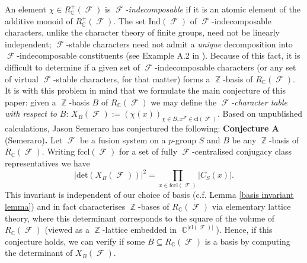 \documentclass[12pt]{article}
\DeclareMathOperator{\C}{\mathbb{C}}
\DeclareMathOperator{\Z}{\mathbb{Z}}
\DeclareMathOperator{\sF}{\mathcal{F}}
\theoremstyle{plain}
\theoremstyle{definition}
\begin{document}
An element $\chi \in R_{\C}^+(\sF)$ is \emph{$\sF$-indecomposable} if it is an atomic element of the additive monoid of $R_{\C}^+(\sF)$. The set $\text{Ind}(\sF)$ of $\sF$-indecomposable characters, unlike the character theory of finite groups, need not be linearly independent; $\sF$-stable characters need not admit a \emph{unique} decomposition into $\sF$-indecomposable constituents (see Example A.2 in  \cite{unique factorisation}). Because of this fact, it is difficult to determine if a given set of $\sF$-indecomposable characters (or any set of virtual $\sF$-stable characters, for that matter) forms a $\Z$-basis of $R_{\C}(\sF)$. It is with this problem in mind that we formulate the main conjecture of this paper: given a $\Z$-basis $B$ of $R_{\C}(\sF)$ we may define the \emph{$\sF$-character table with respect to $B$}: $X_{B}(\sF) := (\chi(x))_{\chi \in B, x^{\sF} \in \text{cl}(\sF)}$. Based on unpublished calculations, Jason Semeraro has conjectured the following:
\newline\newline
\textbf{Conjecture A} (Semeraro)\textbf{.}
Let $\sF$ be a fusion system on a $p$-group $S$ and $B$ be any $\Z$-basis of $R_{\C}(\sF)$. Writing $\text{fccl}(\sF)$ for a set of fully $\sF$-centralised conjugacy class representatives we have
\[|\mathrm{det}(X_B(\sF))|^2 = \displaystyle\prod_{x \in \text{fccl}(\sF)} |C_S(x)|.\]
\newline\newline
This invariant is independent of our choice of basis (c.f. Lemma \ref{basis invariant lemma}) and in fact characterises $\Z$-bases of $R_{\C}(\sF)$ via elementary lattice theory, where this determinant corresponds to the square of the volume of $R_{\C}(\sF)$ (viewed as a $\Z$-lattice embedded in $\C^{|\text{cl}(\sF)|}$). Hence, if this conjecture holds, we can verify if some $B \subseteq R_{\C}(\sF)$ is a basis by computing the determinant of $X_B(\sF)$.
\end{document}
